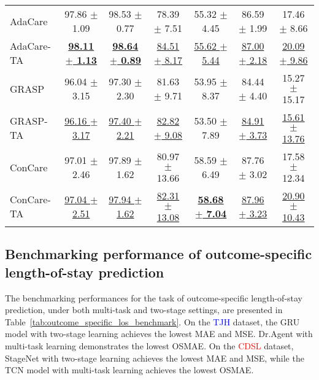 \begin{table}[h!]
{\begin{tabular}{l|ccc|ccc}
AdaCare & 97.86 $\pm$ 1.09 & 98.53 $\pm$ 0.77 & 78.39 $\pm$ 7.51 & 55.32 $\pm$ 4.45 & 86.59 $\pm$ 1.99 & 17.46 $\pm$ 8.66 \\ 
AdaCare-TA & \textbf{\underline{98.11 $\pm$ 1.13}} & \textbf{\underline{98.64 $\pm$ 0.89}} & \underline{84.51 $\pm$ 8.17} & \underline{55.62 $\pm$ 5.44} & \underline{87.00 $\pm$ 2.18} & \underline{20.09 $\pm$ 9.86} \\ 
GRASP & 96.04 $\pm$ 3.15 & 97.30 $\pm$ 2.30 & 81.63 $\pm$ 9.71 & 53.95 $\pm$ 8.37 & 84.44 $\pm$ 4.40 & 15.27 $\pm$ 15.17 \\ 
GRASP-TA & \underline{96.16 $\pm$ 3.17} & \underline{97.40 $\pm$ 2.21} & \underline{82.82 $\pm$ 9.08} & 53.50 $\pm$ 7.89 & \underline{84.91 $\pm$ 3.73} & \underline{15.61 $\pm$ 13.76} \\ 
ConCare & 97.01 $\pm$ 2.46 & 97.89 $\pm$ 1.62 & 80.97 $\pm$ 13.66 & 58.59 $\pm$ 6.49 & 87.76 $\pm$ 3.02 & 17.58 $\pm$ 12.34 \\ 
ConCare-TA & \underline{97.04 $\pm$ 2.51} & \underline{97.94 $\pm$ 1.62} & \underline{82.31 $\pm$ 13.08} & \textbf{\underline{58.68 $\pm$ 7.04}} & \underline{87.96 $\pm$ 3.23} & \underline{20.90 $\pm$ 10.43} \\ 
\bottomrule
\end{tabular}}
\end{table}


\subsection{Benchmarking performance of outcome-specific length-of-stay prediction}
The benchmarking performances for the task of outcome-specific length-of-stay prediction, under both multi-task and two-stage settings, are presented in Table~\ref{tab:outcome_specific_los_benchmark}. On the \textcolor{blue}{TJH} dataset, the GRU model with two-stage learning achieves the lowest MAE and MSE. Dr.Agent with multi-task learning demonstrates the lowest OSMAE. On the \textcolor{red}{CDSL} dataset, StageNet with two-stage learning achieves the lowest MAE and MSE, while the TCN model with multi-task learning achieves the lowest OSMAE.


